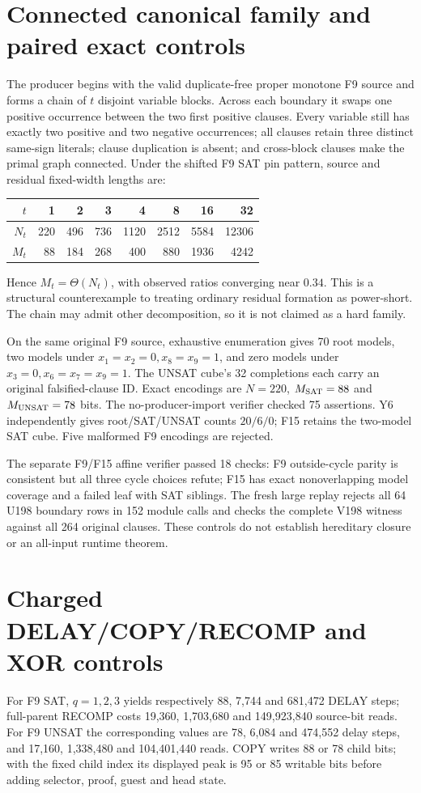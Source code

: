 \documentclass[11pt]{article}
\begin{document}
\section{Connected canonical family and paired exact controls}
The producer begins with the valid duplicate-free proper monotone F9 source and
forms a chain of $t$ disjoint variable blocks.  Across each boundary it swaps
one positive occurrence between the two first positive clauses.  Every
variable still has exactly two positive and two negative occurrences; all
clauses retain three distinct same-sign literals; clause duplication is
absent; and cross-block clauses make the primal graph connected.  Under the
shifted F9 SAT pin pattern, source and residual fixed-width lengths are:
\begin{center}\small
\begin{tabular}{r|rrrrrrr}
$t$&1&2&3&4&8&16&32\\\midrule
$N_t$&220&496&736&1120&2512&5584&12306\\
$M_t$&88&184&268&400&880&1936&4242
\end{tabular}
\end{center}
Hence $M_t=\Theta(N_t)$, with observed ratios converging near $0.34$.  This is a
structural counterexample to treating ordinary residual formation as
power-short.  The chain may admit other decomposition, so it is not claimed as
a hard family.

On the same original F9 source, exhaustive enumeration gives 70 root models,
two models under $x_1=x_2=0,x_8=x_9=1$, and zero models under
$x_3=0,x_6=x_7=x_9=1$.  The UNSAT cube's 32 completions each carry an original
falsified-clause ID.  Exact encodings are $N=220$, $M_{\rm SAT}=88$ and
$M_{\rm UNSAT}=78$ bits.  The no-producer-import verifier checked 75 assertions.
Y6 independently gives root/SAT/UNSAT counts $20/6/0$; F15 retains the
two-model SAT cube.  Five malformed F9 encodings are rejected.

The separate F9/F15 affine verifier passed 18 checks: F9 outside-cycle parity
is consistent but all three cycle choices refute; F15 has exact nonoverlapping
model coverage and a failed leaf with SAT siblings.  The fresh large replay
rejects all 64 U198 boundary rows in 152 module calls and checks the complete
V198 witness against all 264 original clauses.  These controls do not establish
hereditary closure or an all-input runtime theorem.

\section{Charged DELAY/COPY/RECOMP and XOR controls}
For F9 SAT, $q=1,2,3$ yields respectively 88, 7,744 and 681,472 DELAY steps;
full-parent RECOMP costs 19,360, 1,703,680 and 149,923,840 source-bit reads.
For F9 UNSAT the corresponding values are 78, 6,084 and 474,552 delay steps,
and 17,160, 1,338,480 and 104,401,440 reads.  COPY writes 88 or 78 child bits;
with the fixed child index its displayed peak is 95 or 85 writable bits before
adding selector, proof, guest and head state.
\end{document}
